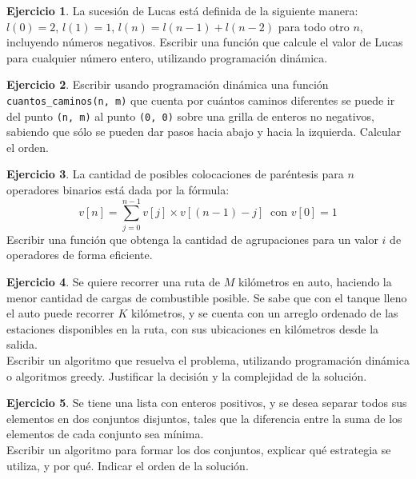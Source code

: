 \documentclass[11pt,a4paper]{article}
\theoremstyle{definition}
\newtheorem{ejercicio}{Ejercicio}[section]
\begin{document}
\begin{ejercicio}
La sucesión de Lucas está definida de la siguiente manera:
$l(0) = 2$, $l(1) = 1$, $l(n) = l(n-1)+l(n-2)$ para todo otro $n$, incluyendo
números negativos. Escribir una función que calcule el valor de Lucas para
cualquier número entero, utilizando programación dinámica.
\end{ejercicio}

\begin{ejercicio}
Escribir usando programación dinámica una función
\lstinline!cuantos_caminos(n, m)! que cuenta por cuántos caminos diferentes
se puede ir del punto \lstinline!(n, m)! al punto \lstinline!(0, 0)! sobre
una grilla de enteros no negativos, sabiendo que sólo se pueden dar pasos
hacia abajo y hacia la izquierda. Calcular el orden.
\end{ejercicio}

\begin{ejercicio}
La cantidad de posibles colocaciones de paréntesis para $n$ operadores
binarios está dada por la fórmula:
\begin{displaymath}
v[n] = \sum_{j=0}^{n-1}{v[j] \times v\left[(n-1)-j\right]} \;\;
\textrm{con } v[0]=1
\end{displaymath}
Escribir una función que obtenga la cantidad de agrupaciones para un valor
$i$ de operadores de forma eficiente.
\end{ejercicio}

\begin{ejercicio}
Se quiere recorrer una ruta de $M$ kilómetros en auto, haciendo la menor
cantidad de cargas de combustible posible. Se sabe que con el tanque lleno
el auto puede recorrer $K$ kilómetros, y se cuenta con un arreglo ordenado de
las estaciones disponibles en la ruta, con sus ubicaciones en kilómetros
desde la salida. \\
Escribir un algoritmo que resuelva el problema, utilizando programación
dinámica o algoritmos greedy.  Justificar la decisión y la complejidad de
la solución.
\end{ejercicio}

\begin{ejercicio}
Se tiene una lista con enteros positivos, y se desea separar todos
sus elementos en dos conjuntos disjuntos, tales que la diferencia
entre la suma de los elementos de cada conjunto sea mínima. \\
Escribir un algoritmo para formar los dos conjuntos, explicar qué
estrategia se utiliza, y por qué.  Indicar el orden de la solución.
\end{ejercicio}
\end{document}
